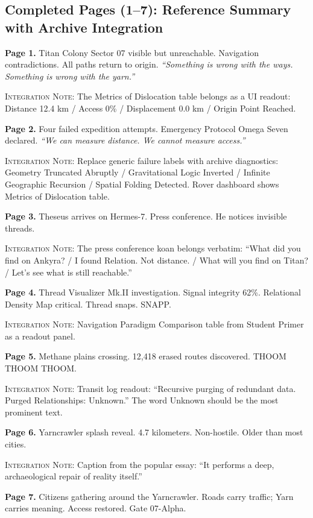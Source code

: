 \documentclass[11pt]{article}
\newcommand{\integration}[1]{\medskip\noindent\textcolor{archiveGold}{\textsc{Integration Note:}} #1\medskip}
\begin{document}
\subsection*{Completed Pages (1--7): Reference Summary with Archive Integration}

\textbf{Page 1.} Titan Colony Sector 07 visible but unreachable. Navigation contradictions. All paths return to origin. \textit{``Something is wrong with the ways. Something is wrong with the yarn.''}

\integration{The Metrics of Dislocation table belongs as a UI readout: Distance 12.4 km / Access 0\% / Displacement 0.0 km / Origin Point Reached.}

\textbf{Page 2.} Four failed expedition attempts. Emergency Protocol Omega Seven declared. \textit{``We can measure distance. We cannot measure access.''}

\integration{Replace generic failure labels with archive diagnostics: Geometry Truncated Abruptly / Gravitational Logic Inverted / Infinite Geographic Recursion / Spatial Folding Detected. Rover dashboard shows Metrics of Dislocation table.}

\textbf{Page 3.} Theseus arrives on Hermes-7. Press conference. He notices invisible threads.

\integration{The press conference koan belongs verbatim: ``What did you find on Ankyra? / I found Relation. Not distance. / What will you find on Titan? / Let's see what is still reachable.''}

\textbf{Page 4.} Thread Visualizer Mk.II investigation. Signal integrity 62\%. Relational Density Map critical. Thread snaps. SNAPP.

\integration{Navigation Paradigm Comparison table from Student Primer as a readout panel.}

\textbf{Page 5.} Methane plains crossing. 12,418 erased routes discovered. THOOM THOOM THOOM.

\integration{Transit log readout: ``Recursive purging of redundant data. Purged Relationships: Unknown.'' The word Unknown should be the most prominent text.}

\textbf{Page 6.} Yarncrawler splash reveal. 4.7 kilometers. Non-hostile. Older than most cities.

\integration{Caption from the popular essay: ``It performs a deep, archaeological repair of reality itself.''}

\textbf{Page 7.} Citizens gathering around the Yarncrawler. Roads carry traffic; Yarn carries meaning. Access restored. Gate 07-Alpha.
\end{document}
